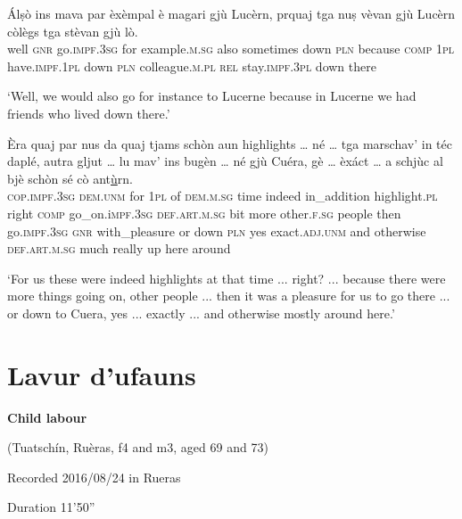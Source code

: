 \begin{linenumbers}
	\gll  Álṣò ins mava par èxèmpal è magari gjù Lucèrn, prquaj tga nuṣ vèvan gjù Lucèrn còlègs tga stèvan gjù lò.\\
	well \textsc{gnr} go.\textsc{impf.3sg} for example\textsc{.m.sg} also sometimes down \textsc{pln} because \textsc{comp} \textsc{1pl} have.\textsc{impf.1pl} down \textsc{pln} colleague.\textsc{m.pl} \textsc{rel} stay.\textsc{impf.3pl} down there\\
\end{linenumbers}
\medskip
\glt `Well, we would also go for instance to Lucerne because in Lucerne we had friends who lived down there.'
\medskip

\begin{linenumbers}
	\gll  Èra quaj par nus da quaj tjams schòn aun highlights … né … tga marschav’ in téc daplé, autra gljut … lu mav’ ins bugèn … né gjù Cuéra, gè … èxáct … a schjùc al bjè schòn sé cò ant\underline{ù}rn.\\
\textsc{cop.impf.3sg} \textsc{dem.unm} for \textsc{1pl} of \textsc{dem.m.sg} time indeed in\_addition highlight.\textsc{pl} {} right {} \textsc{comp} go\_on.i\textsc{mpf.3sg} \textsc{def.art.m.sg} bit more other.\textsc{f.sg} people {} then go.\textsc{impf.3sg} \textsc{gnr} with\_pleasure {} or down \textsc{pln} yes {} exact.\textsc{adj.unm} {} and otherwise \textsc{def.art.m.sg} much really up here around	\\
\end{linenumbers}
\medskip
\glt `For us these were indeed highlights at that time ... right? ... because there were more things going on, other people ... then it was a pleasure for us to go there ... or down to Cuera, yes ... exactly ... and otherwise mostly around here.'
\medskip

\section{Lavur d'ufauns}

\noindent
\textbf{Child labour}

\noindent
(Tuatschín, Ruèras, f4 and m3, aged 69 and 73)

\noindent
Recorded 2016/08/24 in Rueras

\noindent
Duration 11'50''

\bigskip


